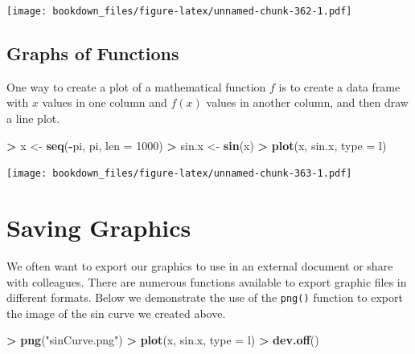 \documentclass[
]{krantz}
\makeatletter
\newenvironment{Shaded}{\begin{snugshade}}{\end{snugshade}}
\newcommand{\DataTypeTok}[1]{\textcolor[rgb]{0.27,0.27,0.27}{#1}}
\newcommand{\DecValTok}[1]{\textcolor[rgb]{0.06,0.06,0.06}{#1}}
\newcommand{\KeywordTok}[1]{\textcolor[rgb]{0.27,0.27,0.27}{\textbf{#1}}}
\newcommand{\NormalTok}[1]{#1}
\newcommand{\OperatorTok}[1]{\textcolor[rgb]{0.43,0.43,0.43}{\textbf{#1}}}
\newcommand{\StringTok}[1]{\textcolor[rgb]{0.5,0.5,0.5}{#1}}
\newenvironment{kframe}{%
\medskip{}
\setlength{\fboxsep}{.8em}
 \def\at@end@of@kframe{}%
 \ifinner\ifhmode%
  \def\at@end@of@kframe{\end{minipage}}%
  \begin{minipage}{\columnwidth}%
 \fi\fi%
 \def\FrameCommand##1{\hskip\@totalleftmargin \hskip-\fboxsep
 \colorbox{shadecolor}{##1}\hskip-\fboxsep
     \hskip-\linewidth \hskip-\@totalleftmargin \hskip\columnwidth}%
 \MakeFramed {\advance\hsize-\width
   \@totalleftmargin\z@ \linewidth\hsize
   \@setminipage}}%
 {\par\unskip\endMakeFramed%
 \at@end@of@kframe}
\renewenvironment{Shaded}{\begin{kframe}}{\end{kframe}}
\makeatother
\begin{document}
\texttt{[image: bookdown\_files/figure-latex/unnamed-chunk-362-1.pdf]}

\hypertarget{graphs-of-functions-1}{%
\subsection{Graphs of Functions}\label{graphs-of-functions-1}}

One way to create a plot of a mathematical function \(f\) is to create a data frame with \(x\) values in one column and \(f(x)\) values in another column, and then draw a line plot.

\begin{Shaded}
\begin{Highlighting}[]
\OperatorTok{\textgreater{}}\StringTok{ }\NormalTok{x \textless{}{-}}\StringTok{ }\KeywordTok{seq}\NormalTok{(}\OperatorTok{{-}}\NormalTok{pi, pi, }\DataTypeTok{len =} \DecValTok{1000}\NormalTok{)}
\OperatorTok{\textgreater{}}\StringTok{ }\NormalTok{sin.x \textless{}{-}}\StringTok{ }\KeywordTok{sin}\NormalTok{(x)}
\OperatorTok{\textgreater{}}\StringTok{ }\KeywordTok{plot}\NormalTok{(x, sin.x, }\DataTypeTok{type =} \StringTok{\textquotesingle{}l\textquotesingle{}}\NormalTok{)}
\end{Highlighting}
\end{Shaded}

\texttt{[image: bookdown\_files/figure-latex/unnamed-chunk-363-1.pdf]}

\hypertarget{saving-graphics-1}{%
\section{Saving Graphics}\label{saving-graphics-1}}

We often want to export our graphics to use in an external document or share with colleagues. There are numerous functions available to export graphic files in different formats. Below we demonstrate the use of the \texttt{png()} function to export the image of the sin curve we created above.

\begin{Shaded}
\begin{Highlighting}[]
\OperatorTok{\textgreater{}}\StringTok{ }\KeywordTok{png}\NormalTok{(}\StringTok{"sinCurve.png"}\NormalTok{)}
\OperatorTok{\textgreater{}}\StringTok{ }\KeywordTok{plot}\NormalTok{(x, sin.x, }\DataTypeTok{type =} \StringTok{\textquotesingle{}l\textquotesingle{}}\NormalTok{)}
\OperatorTok{\textgreater{}}\StringTok{ }\KeywordTok{dev.off}\NormalTok{()}
\end{Highlighting}
\end{Shaded}
\end{document}
